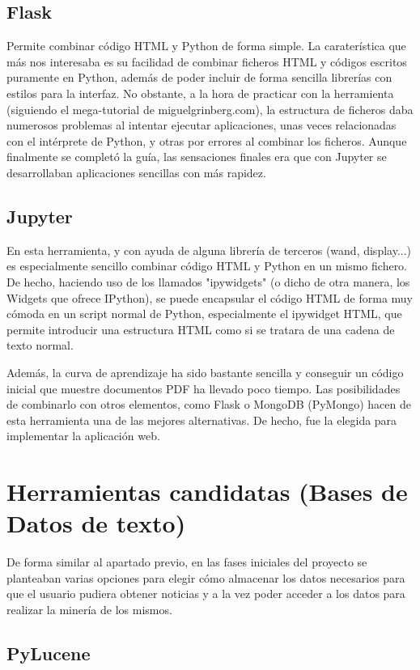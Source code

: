 \subsection{Flask}
Permite combinar código HTML y Python de forma simple. La caraterística que más nos interesaba es su facilidad de combinar ficheros HTML y códigos escritos puramente en Python, además de poder incluir de forma sencilla librerías con estilos para la interfaz.
No obstante, a la hora de practicar con la herramienta (siguiendo el mega-tutorial de miguelgrinberg.com), la estructura de ficheros daba numerosos problemas al intentar ejecutar aplicaciones, unas veces relacionadas con el intérprete de Python, y otras por errores al combinar los ficheros. 
Aunque finalmente se completó la guía, las sensaciones finales era que con Jupyter se desarrollaban aplicaciones sencillas con más rapidez.

\subsection{Jupyter}
En esta herramienta, y con ayuda de alguna librería de terceros (wand, display...) es especialmente sencillo combinar código HTML y Python en un mismo fichero. De hecho, haciendo uso de los llamados "ipywidgets" (o dicho de otra manera, los Widgets que ofrece IPython), se puede encapsular el código HTML de forma muy cómoda en un script normal de Python, especialmente el ipywidget HTML, que permite introducir una estructura HTML como si se tratara de una cadena de texto normal.

Además, la curva de aprendizaje ha sido bastante sencilla y conseguir un código inicial que muestre documentos PDF ha llevado poco tiempo. Las posibilidades de combinarlo con otros elementos, como Flask o MongoDB (PyMongo) hacen de esta herramienta una de las mejores alternativas. De hecho, fue la elegida para implementar la aplicación web.


\bigskip

\section{Herramientas candidatas (Bases de Datos de texto)}
{De forma similar al apartado previo, en las fases iniciales del proyecto se planteaban varias opciones para elegir c\'omo almacenar los datos necesarios para que el usuario pudiera obtener noticias y a la vez poder acceder a los datos para realizar la minería de los mismos.}
\subsection{PyLucene}

